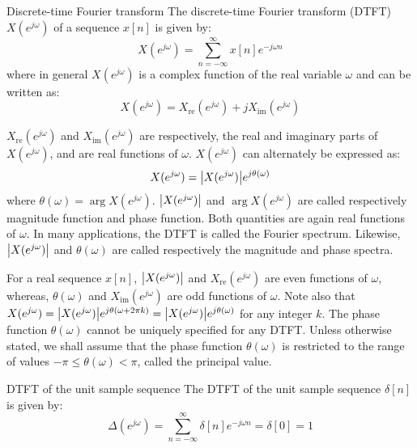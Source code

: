 \documentclass[../../main/main.tex]{subfiles}
\begin{document}
\begin{definition}{Discrete-time Fourier transform}{}
    The discrete-time Fourier transform (DTFT) \( X(e^{j\omega}) \) of a sequence \( x[n] \) is given by:
    \begin{equation}
        X(e^{j\omega})
        =
        \sum_{n=-\infty}^{\infty} x[n] e^{-j\omega n}
        \label{eq:L08_S17_1}
    \end{equation}
    where in general \( X(e^{j\omega}) \) is a complex function of the real variable \( \omega \) and can be written as:
    \begin{equation}
        X(e^{j\omega})
        =
        X_{\mathrm{re}}(e^{j\omega}) + j X_{\mathrm{im}}(e^{j\omega})
        \label{eq:L08_S17_2}
    \end{equation}
\end{definition}

\( X_{\mathrm{re}}(e^{j\omega}) \) and \( X_{\mathrm{im}}(e^{j\omega}) \) are  respectively, the real and imaginary parts of \( X(e^{j\omega}) \), and are real functions of \( \omega \). \( X(e^{j\omega}) \) can alternately be expressed as:
\begin{equation}
    X(e^{j\omega})
    =
    \abs{X(e^{j\omega})} e^{j\theta(\omega)}
    \label{eq:L08_S18_1}
\end{equation}
where \( \theta(\omega) = \arg{X(e^{j\omega})} \). \( \abs{X(e^{j\omega})} \) and \( \arg{X(e^{j\omega})} \) are called respectively magnitude function and phase function. Both quantities are again real functions of \( \omega \). In many applications, the DTFT is called the Fourier spectrum. Likewise, \( \abs{X(e^{j\omega})} \) and \( \theta(\omega) \) are called respectively the magnitude and phase spectra.

For a real sequence \( x[n] \), \( \abs{X(e^{j\omega})} \) and \( X_{\mathrm{re}}(e^{j\omega}) \) are even functions of \( \omega \), whereas, \( \theta(\omega) \) and \( X_{\mathrm{im}}(e^{j\omega}) \) are odd functions of \( \omega \).
Note also that \( X(e^{j\omega}) = \abs{X(e^{j\omega})} e^{j\theta(\omega + 2\pi k)} = \abs{X(e^{j\omega})} e^{j\theta(\omega)} \) for any integer \( k \). The phase function \( \theta(\omega) \) cannot be uniquely specified for any DTFT.
Unless otherwise stated, we shall assume that the phase function \( \theta(\omega) \) is restricted to the range of values \( -\pi \le \theta(\omega) < \pi \), called the principal value.

\begin{example}{DTFT of the unit sample sequence}{}
    The DTFT of the unit sample sequence \( \delta[n] \) is given by:
    \begin{equation}
        \Delta(e^{j\omega})
        =
        \sum_{n=-\infty}^{\infty} \delta[n] e^{-j\omega n}
        =
        \delta[0]
        =
        1
        \label{eq:L08_S22_1}
    \end{equation}
\end{example}
\end{document}
